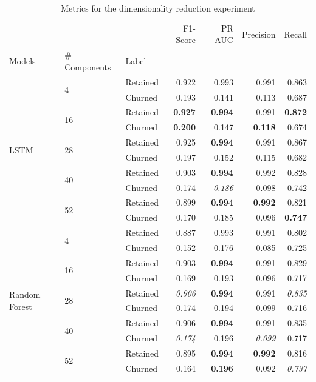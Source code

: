\documentclass{kththesis}
\begin{document}
\begin{table}
\centering
\begin{tabular}{lllrrrr}
\toprule
     &   &          &  F1-Score &    PR AUC &  Precision &    Recall \\
Models & \# Components & Label &           &           &            &           \\
\midrule
\multirow{10}{*}{LSTM} & \multirow{2}{*}{4} & Retained &  0.922 &  0.993 &   0.991 &  0.863 \\
     &   & Churned &  0.193 &  0.141 &   0.113 &  0.687 \\
\cline{2-7}
     & \multirow{2}{*}{16} & Retained &  \textbf{0.927} &  \textbf{0.994} &   0.991 &  \textbf{0.872} \\
     &   & Churned &  \textbf{0.200} &  0.147 &   \textbf{0.118} &  0.674 \\
\cline{2-7}
     & \multirow{2}{*}{28} & Retained &  0.925 &  \textbf{0.994} &   0.991 &  0.867 \\
     &   & Churned &  0.197 &  0.152 &   0.115 &  0.682 \\
\cline{2-7}
     & \multirow{2}{*}{40} & Retained &  0.903 &  \textbf{0.994} &   0.992 &  0.828 \\
     &   & Churned &  0.174 &  \textit{0.186} &   0.098 &  0.742 \\
\cline{2-7}
     & \multirow{2}{*}{52} & Retained &  0.899 &  \textbf{0.994} &   \textbf{0.992} &  0.821 \\
     &   & Churned &  0.170 &  0.185 &   0.096 &  \textbf{0.747} \\
\cline{1-7}
\cline{2-7}
\multirow{10}{*}{Random Forest} & \multirow{2}{*}{4} & Retained &  0.887 &  0.993 &   0.991 &  0.802 \\
     &   & Churned &  0.152 &  0.176 &   0.085 &  0.725 \\
\cline{2-7}
     & \multirow{2}{*}{16} & Retained &  0.903 &  \textbf{0.994} &   0.991 &  0.829 \\
     &   & Churned &  0.169 &  0.193 &   0.096 &  0.717 \\
\cline{2-7}
     & \multirow{2}{*}{28} & Retained &  \textit{0.906} &  \textbf{0.994} &   0.991 &  \textit{0.835} \\
     &   & Churned &  0.174 &  0.194 &   0.099 &  0.716 \\
\cline{2-7}
     & \multirow{2}{*}{40} & Retained &  0.906 &  \textbf{0.994} &   0.991 &  0.835 \\
     &   & Churned &  \textit{0.174} &  0.196 &   \textit{0.099} &  0.717 \\
\cline{2-7}
     & \multirow{2}{*}{52} & Retained &  0.895 &  \textbf{0.994} &   \textbf{0.992} &  0.816 \\
     &   & Churned &  0.164 &  \textbf{0.196} &   0.092 &  \textit{0.737} \\
\bottomrule
\end{tabular}
\caption{Metrics for the dimensionality reduction experiment}
\label{tab:dim_reduction}
\end{table}
\end{document}
